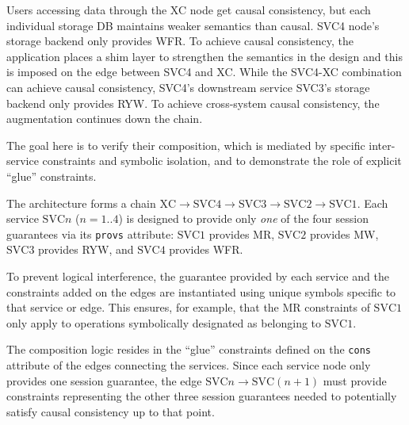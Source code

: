 Users accessing data through the XC node get causal consistency,
but each individual storage DB maintains weaker semantics than causal.
SVC4 node's storage backend only provides WFR. To achieve causal
consistency, the application places a shim layer to strengthen the semantics
in the design and this is imposed on the edge between SVC4 and XC.
While the SVC4-XC combination can achieve causal consistency, SVC4's
downstream service SVC3's storage backend only provides RYW. To achieve
cross-system causal consistency, the augmentation continues down the chain.


The goal here is to verify their composition, which is mediated by specific inter-service 
constraints and symbolic isolation, and to demonstrate the role of explicit ``glue'' constraints.


 The architecture forms a chain $\text{XC} \rightarrow
\text{SVC4} \rightarrow \text{SVC3} \rightarrow \text{SVC2}
\rightarrow \text{SVC1}$.
Each service $\text{SVC}n$ ($n=1..4$) is designed to provide only
\textit{one} of the
four session guarantees via its \texttt{provs} attribute:
$\text{SVC}1$ provides MR, $\text{SVC}2$ provides
MW, $\text{SVC}3$ provides RYW, and $\text{SVC}4$ provides WFR.

To prevent logical interference, the guarantee provided by
each service and the constraints added on the edges are instantiated
using unique
symbols specific to that service or edge.
This ensures, for example, that the MR constraints of
$\text{SVC}1$ only apply to operations symbolically designated as belonging to
$\text{SVC}1$.

The composition logic resides in the ``glue''
constraints defined on the \texttt{cons} attribute of the edges connecting the
services. Since each service node only provides one session
guarantee, the edge $\text{SVC}n \rightarrow \text{SVC}(n+1)$ must
provide constraints representing the other three session guarantees needed to
potentially satisfy causal consistency up to that point.


